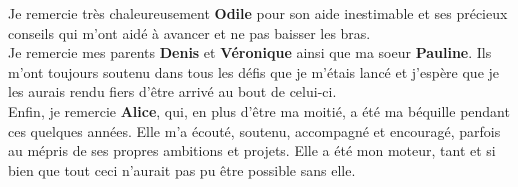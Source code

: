 Je remercie très chaleureusement \textbf{Odile} pour son aide inestimable et ses
précieux conseils qui m'ont aidé à avancer et ne pas baisser les bras.\\

Je remercie mes parents \textbf{Denis} et \textbf{Véronique} ainsi que ma soeur
\textbf{Pauline}. Ils m'ont toujours soutenu dans tous les défis que je m'étais
lancé et j'espère que je les aurais rendu fiers d'être arrivé au bout de celui-ci.\\

Enfin, je remercie \textbf{Alice}, qui, en plus d'être ma moitié, a été ma
béquille pendant ces quelques années. Elle m'a écouté, soutenu, accompagné et
encouragé, parfois au mépris de ses propres ambitions et projets. Elle a été mon
moteur, tant et si bien que tout ceci n'aurait pas pu être possible sans elle.\\ 

